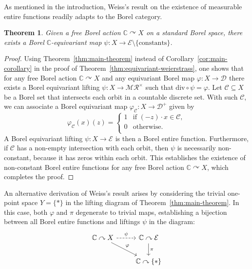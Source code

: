 \documentclass[12pt]{paper}
\numberwithin{equation}{section}
\theoremstyle{plain}
\newtheorem{theorem}{Theorem}[section]
\theoremstyle{definition}
\newcommand{\C}{\mathbb{C}}
\newcommand{\merom}[1][]{\mathcal{MR}_{#1}}
\newcommand{\meromnz}{\merom^{\times}}
\newcommand{\holom}[1][]{\mathcal{E}_{#1}}
\newcommand{\divis}[1][]{\mathcal{D}_{#1}}
\newcommand{\divisp}[1][]{\divis[#1]^{+}}
\newcommand{\dm}{\mathrm{div}}      %
\newcommand{\acts}{\curvearrowright}
\renewcommand{\phi}{\varphi}
\begin{document}
As mentioned in the introduction, Weiss's result \cite{MR1422707} on the existence
of measurable entire functions readily adapts to the Borel category.

\begin{theorem}
\label{thm:Weiss-Borel}
Given a free Borel action \(\C\acts X\) on a standard Borel space, there exists
a Borel \(\C\)-equivariant map \(\psi:X\to \mathcal{E}\setminus \{\text{constants}\}\).
\end{theorem}

\begin{proof}
Using Theorem~\ref{thm:main-theorem} instead of
Corollary~\ref{cor:main-corollary} in the proof of
Theorem~\ref{thm:equivariant-weierstrass}, one shows that for any free Borel action \(\C \acts X\)
and any equivariant Borel map \(\phi : X \to \divis\) there exists a Borel equivariant lifting
\(\psi : X \to \meromnz\) such that \(\dm \circ \psi = \phi\).  Let \(\mathcal{C} \subseteq X\) be
a Borel set that intersects each orbit in a countable discrete set.  With such \(\mathcal{C}\), we
can associate a Borel equivariant map \(\phi_{\mathcal{C}} : X \to \divisp\) given by
\begin{displaymath}
\phi_{\mathcal{C}}(x)(z) =
\begin{cases}
1 & \textrm{if \((-z) \cdot x \in \mathcal{C}\)}, \\
0 & \textrm{otherwise}. \\
\end{cases}
\end{displaymath}
A Borel equivariant lifting \(\psi : X \to \holom\) is then a Borel entire function.  Furthermore,
if \(\mathcal{C}\) has a non-empty intersection with each orbit, then \(\psi\) is necessarily
non-constant, because it has zeros within each orbit.  This establishes the existence of
non-constant Borel entire functions for any free Borel action \(\C \acts X\), which completes the proof.
\end{proof}

An alternative derivation of Weiss's result arises by considering the trivial one-point space
\(Y = \{*\}\) in the lifting diagram of Theorem~\ref{thm:main-theorem}. In this case, both
\(\phi\) and \(\pi\) degenerate to trivial maps, establishing a bijection between all Borel entire
functions and liftings \(\psi\) in the diagram:
\begin{displaymath}
\begin{tikzcd}[ampersand replacement=\&]
\C \acts X \arrow[r, dashed, "\psi"] \arrow[dr, "\phi"]
\& \C \acts \holom \arrow[d, "\pi"]\\
\& \C \acts \{*\}
\end{tikzcd}
\end{displaymath}
\end{document}
